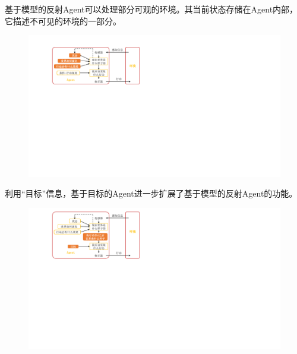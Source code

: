 \begin{definition}[基于模型的反射Agent]
    基于模型的反射Agent可以处理部分可观的环境。其当前状态存储在Agent内部，它描述不可见的环境的一部分。
\end{definition}
\begin{figure}[htbp]
    \centering
    \includegraphics{image/基于模型的反射Agent.pdf}
\end{figure}

\begin{definition}[基于目标的Agent]
    利用“目标”信息，基于目标的Agent进一步扩展了基于模型的反射Agent的功能。  
\end{definition}
\begin{figure}[H]
    \centering
    \includegraphics{image/基于目标的反射Agent.pdf}
\end{figure}

